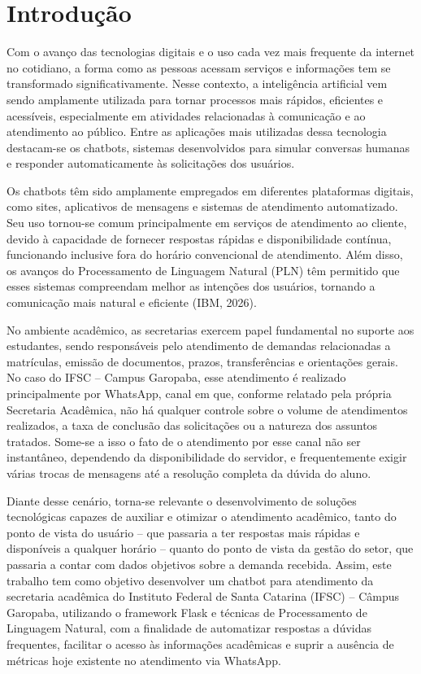 \documentclass[12pt]{article}
\begin{document}
\section{Introdução}

Com o avanço das tecnologias digitais e o uso cada vez mais frequente da
internet no cotidiano, a forma como as pessoas acessam serviços e
informações tem se transformado significativamente. Nesse contexto, a
inteligência artificial vem sendo amplamente utilizada para tornar
processos mais rápidos, eficientes e acessíveis, especialmente em
atividades relacionadas à comunicação e ao atendimento ao público. Entre
as aplicações mais utilizadas dessa tecnologia destacam-se os chatbots,
sistemas desenvolvidos para simular conversas humanas e responder
automaticamente às solicitações dos usuários.

Os chatbots têm sido amplamente empregados em diferentes plataformas
digitais, como sites, aplicativos de mensagens e sistemas de atendimento
automatizado. Seu uso tornou-se comum principalmente em serviços de
atendimento ao cliente, devido à capacidade de fornecer respostas rápidas
e disponibilidade contínua, funcionando inclusive fora do horário
convencional de atendimento. Além disso, os avanços do Processamento de
Linguagem Natural (PLN) têm permitido que esses sistemas compreendam
melhor as intenções dos usuários, tornando a comunicação mais natural e
eficiente (IBM, 2026).

No ambiente acadêmico, as secretarias exercem papel fundamental no
suporte aos estudantes, sendo responsáveis pelo atendimento de demandas
relacionadas a matrículas, emissão de documentos, prazos, transferências
e orientações gerais. No caso do IFSC -- Campus Garopaba, esse
atendimento é realizado principalmente por WhatsApp, canal em que,
conforme relatado pela própria Secretaria Acadêmica, não há qualquer
controle sobre o volume de atendimentos realizados, a taxa de conclusão
das solicitações ou a natureza dos assuntos tratados. Some-se a isso o
fato de o atendimento por esse canal não ser instantâneo, dependendo da
disponibilidade do servidor, e frequentemente exigir várias trocas de
mensagens até a resolução completa da dúvida do aluno.

Diante desse cenário, torna-se relevante o desenvolvimento de soluções
tecnológicas capazes de auxiliar e otimizar o atendimento acadêmico,
tanto do ponto de vista do usuário -- que passaria a ter respostas mais
rápidas e disponíveis a qualquer horário -- quanto do ponto de vista da
gestão do setor, que passaria a contar com dados objetivos sobre a
demanda recebida. Assim, este trabalho tem como objetivo desenvolver um
chatbot para atendimento da secretaria acadêmica do Instituto Federal de
Santa Catarina (IFSC) -- Câmpus Garopaba, utilizando o framework Flask e
técnicas de Processamento de Linguagem Natural, com a finalidade de
automatizar respostas a dúvidas frequentes, facilitar o acesso às
informações acadêmicas e suprir a ausência de métricas hoje existente no
atendimento via WhatsApp.
\end{document}
